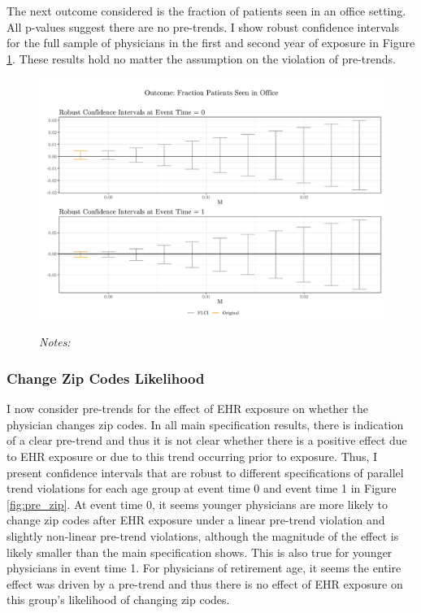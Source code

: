 \documentclass[12pt]{article}
\begin{document}
The next outcome considered is the fraction of patients seen in an office setting. All p-values suggest there are no pre-trends. I show robust confidence intervals for the full sample of physicians in the first and second year of exposure in Figure \ref{fig:pre_frac}. These results hold no matter the assumption on the violation of pre-trends. 

\begin{figure}[ht]
    \centering
    \captionsetup{width=.5\linewidth}
    \caption{}
    \includegraphics[scale=.5]{Objects/frac_pretrends_plot.pdf}
    \label{fig:pre_frac}
    \vspace{2mm}
    \caption*{\footnotesize{\textit{Notes:}}}
\end{figure}

\subsubsection{Change Zip Codes Likelihood}

I now consider pre-trends for the effect of EHR exposure on whether the physician changes zip codes. In all main specification results, there is indication of a clear pre-trend and thus it is not clear whether there is a positive effect due to EHR exposure or due to this trend occurring prior to exposure. Thus, I present confidence intervals that are robust to different specifications of parallel trend violations for each age group at event time 0 and event time 1 in Figure \ref{fig:pre_zip}. At event time 0, it seems younger physicians are more likely to change zip codes after EHR exposure under a linear pre-trend violation and slightly non-linear pre-trend violations, although the magnitude of the effect is likely smaller than the main specification shows. This is also true for younger physicians in event time 1. For physicians of retirement age, it seems the entire effect was driven by a pre-trend and thus there is no effect of EHR exposure on this group's likelihood of changing zip codes. 
\end{document}
